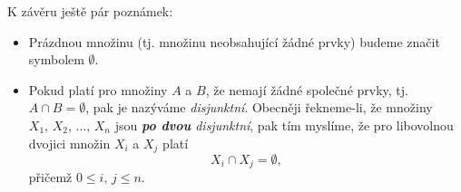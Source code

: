 \begin{remark}
    K závěru ještě pár poznámek:
    \begin{itemize}
        \item Prázdnou množinu (tj. množinu neobsahující žádné prvky) budeme značit symbolem $\emptyset$.
        \item Pokud platí pro množiny $A$ a $B$, že nemají žádné společné prvky, tj. $A \cap B=\emptyset$, pak je nazýváme \emph{disjunktní}. Obecněji řekneme-li, že množiny $X_1,\,X_2,\,\dots,\,X_n$ jsou \emph{\textbf{po dvou} disjunktní}, pak tím myslíme, že pro libovolnou dvojici množin $X_i$ a $X_j$ platí
        \begin{equation*}
            X_i \cap X_j = \emptyset,
        \end{equation*}
        přičemž $0 \leqslant i,\,j \leqslant n$.
    \end{itemize}
\end{remark}